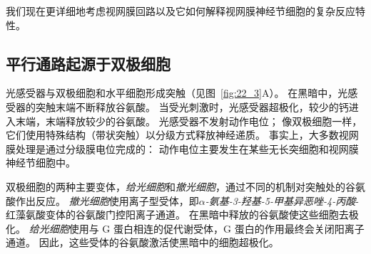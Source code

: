 我们现在更详细地考虑视网膜回路以及它如何解释视网膜神经节细胞的复杂反应特性。



\subsection{平行通路起源于双极细胞}

光感受器与双极细胞和水平细胞形成突触（见图~\ref{fig:22_3}A）。
在黑暗中，光感受器的突触末端不断释放谷氨酸。
当受光刺激时，光感受器超极化，较少的钙进入末端，末端释放较少的谷氨酸。
光感受器不发射动作电位；
像双极细胞一样，它们使用特殊结构（带状突触）以分级方式释放神经递质。
事实上，大多数视网膜处理是通过分级膜电位完成的：
动作电位主要发生在某些无长突细胞和视网膜神经节细胞中。


双极细胞的两种主要变体，\textit{给光细胞}和\textit{撤光细胞}，通过不同的机制对突触处的谷氨酸作出反应。
\textit{撤光细胞}使用离子型受体，即\textit{$\alpha$-氨基-3-羟基-5-甲基异恶唑-4-丙酸}-红藻氨酸变体的谷氨酸门控阳离子通道。
在黑暗中释放的谷氨酸使这些细胞去极化。
\textit{给光细胞}使用与 G 蛋白相连的促代谢受体，G 蛋白的作用最终会关闭阳离子通道。
因此，这些受体的谷氨酸激活使黑暗中的细胞超极化。


